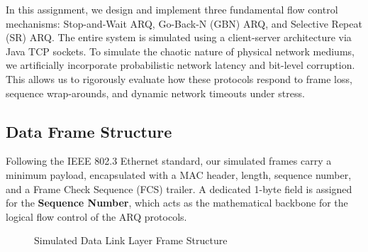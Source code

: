 \documentclass[12pt]{article}
\begin{document}
In this assignment, we design and implement three fundamental flow control mechanisms: Stop-and-Wait ARQ, Go-Back-N (GBN) ARQ, and Selective Repeat (SR) ARQ. The entire system is simulated using a client-server architecture via Java TCP sockets. To simulate the chaotic nature of physical network mediums, we artificially incorporate probabilistic network latency and bit-level corruption. This allows us to rigorously evaluate how these protocols respond to frame loss, sequence wrap-arounds, and dynamic network timeouts under stress.

\subsection{Data Frame Structure}
Following the IEEE 802.3 Ethernet standard, our simulated frames carry a minimum payload, encapsulated with a MAC header, length, sequence number, and a Frame Check Sequence (FCS) trailer. A dedicated 1-byte field is assigned for the \textbf{Sequence Number}, which acts as the mathematical backbone for the logical flow control of the ARQ protocols.

\begin{figure}[H]
    \centering
    \caption{Simulated Data Link Layer Frame Structure}
\end{figure}
\end{document}
